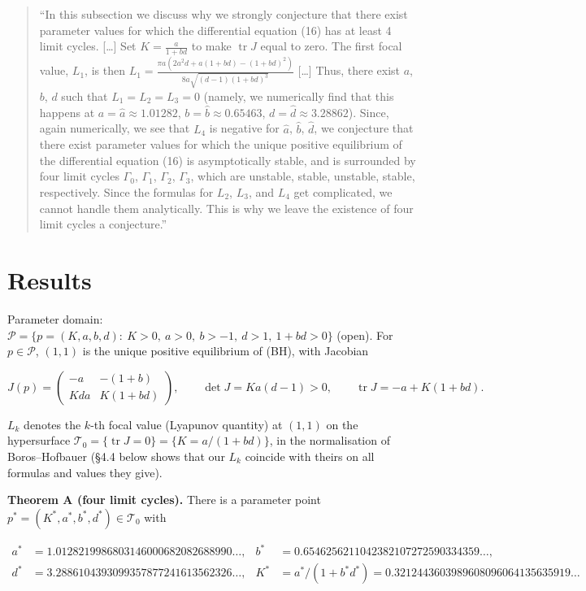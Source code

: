 \documentclass[11pt,a4paper]{report}
\begin{document}
\begin{quote}
``In this subsection we discuss why we strongly conjecture that there exist parameter values for which the
differential equation (16) has at least 4 limit cycles. {[}\ldots{]} Set \(K=\frac{a}{1+bd}\) to make \(\operatorname{tr} J\)
equal to zero. The first focal value, \(L_1\), is then
\(L_1 = \frac{\pi a (2a^2d+a(1+bd)-(1+bd)^2)}{8a\sqrt{(d-1)(1+bd)^3}}\) {[}\ldots{]} Thus, there exist \(a\), \(b\), \(d\)
such that \(L_1=L_2=L_3=0\) (namely, we numerically find that this happens at \(a = \widehat{a} \approx 1.01282\),
\(b = \widehat{b} \approx 0.65463\), \(d = \widehat{d} \approx 3.28862\)). Since, again numerically, we see that
\(L_4\) is negative for \(\widehat{a}\), \(\widehat{b}\), \(\widehat{d}\), we conjecture that there exist parameter
values for which the unique positive equilibrium of the differential equation (16) is asymptotically stable,
and is surrounded by four limit cycles \(\Gamma_0\), \(\Gamma_1\), \(\Gamma_2\), \(\Gamma_3\), which are unstable,
stable, unstable, stable, respectively. Since the formulas for \(L_2\), \(L_3\), and \(L_4\) get complicated, we
cannot handle them analytically. This is why we leave the existence of four limit cycles a conjecture.''
\end{quote}

\section{Results}

Parameter domain: \(\mathcal P=\{p=(K,a,b,d):\ K>0,\ a>0,\ b>-1,\ d>1,\ 1+bd>0\}\) (open).
For \(p\in\mathcal P\), \((1,1)\) is the unique positive equilibrium of (BH), with Jacobian

\[J(p)=\begin{pmatrix}-a & -(1+b)\\ Kda & K(1+bd)\end{pmatrix},\qquad
\det J = Ka(d-1)>0,\qquad \operatorname{tr}J = -a+K(1+bd).\]

\(L_k\) denotes the \(k\)-th focal value (Lyapunov quantity) at \((1,1)\) on the hypersurface
\(\mathcal T_0=\{\operatorname{tr}J=0\}=\{K=a/(1+bd)\}\), in the normalisation of Boros--Hofbauer (§4.4 below
shows that our \(L_k\) coincide with theirs on all formulas and values they give).

\textbf{Theorem A (four limit cycles).} There is a parameter point
\(p^*=(K^*,a^*,b^*,d^*)\in\mathcal T_0\) with

\[\begin{aligned}
a^* &= 1.0128219986803146000682082688990\ldots, &
b^* &= 0.6546256211042382107272590334359\ldots,\\
d^* &= 3.2886104393099357877241613562326\ldots, &
K^* &= a^*/(1+b^*d^*) = 0.3212443603989608096064135635919\ldots
\end{aligned}\]
\end{document}
